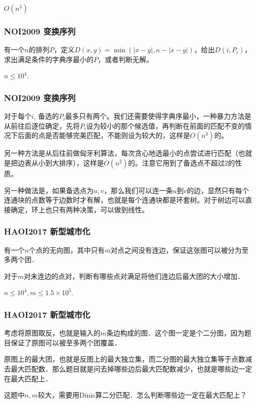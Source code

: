 \documentclass[10pt]{beamer}
\begin{document}
\begin{CJK}{UTF8}{gkai}
\begin{spacing}{1.1}
\begin{frame}
	$O(n^3)$

\end{frame}

\begin{frame}
\frametitle{NOI2009 变换序列}

	有一个$n$的排列$P$，定义$D(x, y) = \min(|x - y|, n - |x - y|)$，给出$D(i, P_i)$，求出满足条件的字典序最小的$P$，或者判断无解。

	$n \le 10^4$.

\end{frame}

\begin{frame}
\frametitle{NOI2009 变换序列}

	对于每个$i$, 备选的$P_i$最多只有两个。我们还需要使得字典序最小，一种暴力方法是从前往后逐位确定，先将$P_i$设为较小的那个候选值，再判断在前面的匹配不变的情况下后面的点是否能够完美匹配，不能则设为较大的，这样是$O(n^3)$的。\pause
	
	另一种方法是从后往前做匈牙利算法，每次贪心地选最小的点尝试进行匹配（也就是把边表从小到大排序），这样是$O(n^2)$的。注意它用到了备选点不超过$2$的性质。\pause

	另一种做法是，如果备选点为$u, v$，那么我们可以连一条$u$到$v$的边，显然只有每个连通块的点数等于边数时才有解，也就是每个连通块都是环套树。对于树边可以直接确定，环上也只有两种决策，可以做到线性。

\end{frame}

\begin{frame}
\frametitle{HAOI2017 新型城市化}

	有一个$n$个点的无向图，其中只有$m$对点之间没有连边，保证这张图可以被分为至多两个团．

	对于$m$对未连边的点对，判断有哪些点对满足将他们连边后最大团的大小增加．

	$n \le 10^4, m \le 1.5 \times 10^5$.

\end{frame}

\begin{frame}
\frametitle{HAOI2017 新型城市化}

	考虑将原图取反，也就是输入的$m$条边构成的图．这个图一定是个二分图，因为题目保证了原图可以被至多两个团覆盖．\pause

	原图上的最大团，也就是反图上的最大独立集，而二分图的最大独立集等于点数减去最大匹配数．那么题目就是问去掉哪些边后最大匹配数减少，也就是哪些边一定在最大匹配上．\pause

	这题中$n, m$较大，需要用Dinic算二分匹配．怎么判断哪些边一定在最大匹配上？\pause
	

\end{frame}
\end{spacing}
\end{CJK}
\end{document}
